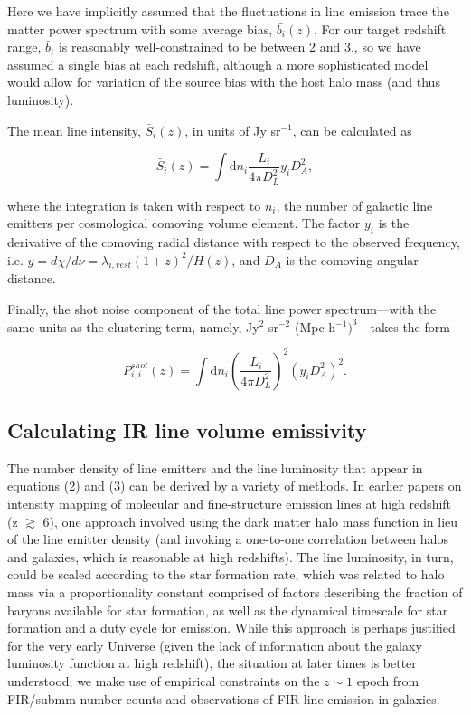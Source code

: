 \documentclass[iop]{emulateapj}
\begin{document}
Here we have implicitly assumed that the fluctuations in line emission trace the matter power spectrum with some average bias, $\bar{b_i}(z)$. For our target redshift range, $\bar{b}_i$ is reasonably well-constrained to be between 2 and 3.\citep{Cooray10, Jullo12}, so we have assumed a single bias at each redshift, although a more sophisticated model would allow for variation of the source bias with the host halo mass (and thus luminosity). 

The mean line intensity, $\bar{S}_{i}(z)$, in units of Jy sr$^{-1}$, can be calculated as

\begin{equation}
\bar{S}_{i}(z) = \int{\mathrm{d}n_{i} \frac{L_{i}}{4\pi D_L^2}} y_i D_A^2 ,
\label{eq:si}
\end{equation}

where the integration is taken with respect to $n_{i}$, the number of galactic line emitters per cosmological comoving volume element. The factor $y_i$ is the derivative of the comoving radial distance with respect to the observed frequency, i.e. $y = d\chi/d\nu = \lambda_{i,rest} (1+z)^2/H(z)$, and $D_A$ is the comoving angular distance.

Finally, the shot noise component of the total line power spectrum---with the same units as the clustering term, namely, Jy$^2$ sr$^{-2}$ (Mpc h$^{-1})^{3}$---takes the form 

\begin{equation}
P_{i,i}^{shot}(z) = \int{\mathrm{d}n_{i} \left( \frac{L_{i}}{4\pi D_L^2} \right)^2 \left( y_i D_A^2 \right)^2}.
 \label{eq:pshot}
\end{equation}

\subsection{Calculating IR line volume emissivity}

The number density of line emitters and the line luminosity that appear in equations (2) and (3) can be derived by a variety of methods. In earlier papers on intensity mapping of molecular and fine-structure emission lines at high redshift (z $\gtrsim$ 6), one approach involved using the dark matter halo mass function in lieu of the line emitter density (and invoking a one-to-one correlation between halos and galaxies, which is reasonable at high redshifts). The line luminosity, in turn, could be scaled according to the star formation rate, which was related to halo mass via a proportionality constant comprised of factors describing the fraction of baryons available for star formation, as well as the dynamical timescale for star formation and a duty cycle for emission. While this approach is perhaps justified for the very early Universe (given the lack of information about the galaxy luminosity function at high redshift), the situation at later times is better understood; we make use of empirical constraints on the $z\sim1$ epoch from FIR/submm number counts and observations of FIR line emission in galaxies. 
\end{document}
